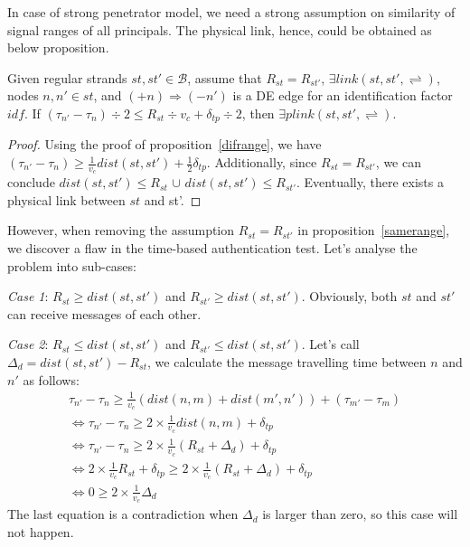 In case of strong penetrator model, we need a strong assumption on similarity of signal ranges of all principals. The physical link, hence, could be obtained as below proposition. 

\begin{Proposition}\label{samerange}
Given regular strands $st, st' \in \mathcal{B}$, assume that $R_{st} = R_{st'}$, $\exists link(st,st', \rightleftharpoons)$, nodes $n,n' \in st$, and $(+n) \Rightarrow (-n')$ is a DE edge for an identification factor $idf$. If $(\tau_{n'} - \tau_{n})\div 2 \le R_{st} \div v_c + \delta_{tp} \div 2$, then $\exists plink(st,st',\rightleftharpoons)$. 
\end{Proposition}
\begin{proof}

Using the proof of proposition~\ref{difrange}, we have $(\tau_{n'} - \tau_{n}) \ge \frac 1 {v_c} dist(st,st') + \frac 1 {2} \delta_{tp}$. Additionally, since $R_{st} = R_{st'}$, we can conclude $dist(st,st') \le R_{st}$ $\cup$ $dist(st,st') \le R_{st'}$. Eventually, there exists a physical link between $st$ and st'. 

\end{proof}

However, when removing the assumption $R_{st} = R_{st'}$ in proposition~\ref{samerange}, we discover a flaw in the time-based authentication test. Let's analyse the problem into sub-cases:

\emph{Case 1}: $R_{st} \ge dist(st,st')$ and $R_{st'} \ge dist(st,st')$. Obviously, both $st$ and $st'$ can receive messages of each other. 

\emph{Case 2}: $R_{st} \le dist(st,st')$ and $R_{st'} \le dist(st,st')$. Let's call $\Delta_d = dist(st,st') - R_{st}$, we calculate the message travelling time between $n$ and $n'$ as follows: 
\begin{equation*}
\begin{split}
	 \tau_{n'} - \tau_{n} \ge \frac 1 {v_c}(dist(n,m) + dist(m', n')) + (\tau_{m'} - \tau_{m}) \\ \Leftrightarrow
	\tau_{n'} - \tau_{n} \ge 2 \times \frac 1 {v_c} dist(n,m) + \delta_{tp}  \\
\Leftrightarrow	\tau_{n'} - \tau_{n} \ge 2 \times \frac 1 {v_c}(R_{st} + \Delta_d) + \delta_{tp} \\
\Leftrightarrow	2 \times \frac 1 {v_c} R_{st} + \delta_{tp} \ge 2 \times \frac 1 {v_c} (R_{st} + \Delta_d) + \delta_{tp} \\
\Leftrightarrow	0 \ge 2 \times \frac 1 {v_c} \Delta_d 
\end{split}
\end{equation*}
The last equation is a contradiction when $\Delta_d$ is larger than zero, so this case will not happen. 

